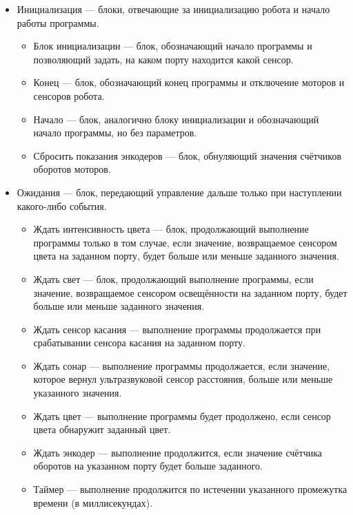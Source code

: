 \documentclass[a4paper]{article}
\begin{document}
{\begin{itemize}
\begin{itemize}
    \item Моторы вперёд --- команда роботу включить моторы на заданных портах с заданной мощностью на заданное количество оборотов. Если число оборотов указано как 0, моторы будут работать неограниченно.
    \item Моторы назад --- команда роботу включить моторы в режиме движения назад с параметрами, аналогичными параметрам блока ``Моторы вперёд’’.
    \item Моторы стоп --- команда роботу выключить моторы.
    \item Функция --- блок для записи произвольного математического выражения или кода на С.
  \end{itemize}
  \item Инициализация --- блоки, отвечающие за инициализацию робота и начало работы программы.
  \begin{itemize}
    \item Блок инициализации --- блок, обозначающий начало программы и позволяющий задать, на каком порту находится какой сенсор.
    \item Конец --- блок, обозначающий конец программы и отключение моторов и сенсоров робота.
    \item Начало --- блок, аналогично блоку инициализации и обозначающий начало программы, но без параметров.
    \item Сбросить показания энкодеров --- блок, обнуляющий значения счётчиков оборотов моторов.
  \end{itemize}
  \item Ожидания --- блок, передающий управление дальше только при наступлении какого-либо события.
  \begin{itemize}
    \item Ждать интенсивность цвета --- блок, продолжающий выполнение программы только в том случае, если значение, возвращаемое сенсором цвета на заданном порту, будет больше или меньше заданного значения.
    \item Ждать свет --- блок, продолжающий выполнение программы, если значение, возвращаемое сенсором освещённости на заданном порту, будет больше или меньше заданного значения.
    \item Ждать сенсор касания --- выполнение программы продолжается при срабатывании сенсора касания на заданном порту.
    \item Ждать сонар --- выполнение программы продолжается, если значение, которое вернул ультразвуковой сенсор расстояния, больше или меньше указанного значения.
    \item Ждать цвет --- выполнение программы будет продолжено, если сенсор цвета обнаружит заданный цвет.
    \item Ждать энкодер --- выполнение продолжится, если значение счётчика оборотов на указанном порту будет больше заданного.
    \item Таймер --- выполнение продолжится по истечении указанного промежутка времени (в миллисекундах).
  \end{itemize}
\end{itemize}

}
\end{document}

